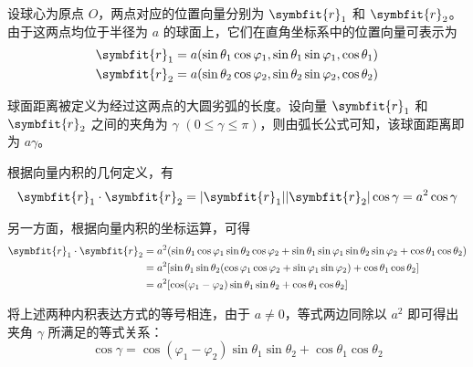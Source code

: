 \begin{myproof}
    设球心为原点 $O$，两点对应的位置向量分别为 $\symbfit{r}_1$ 和 $\symbfit{r}_2$。由于这两点均位于半径为 $a$ 的球面上，它们在直角坐标系中的位置向量可表示为
    \begin{equation}
        \begin{aligned}
            \symbfit{r}_1 & = a (\sin\theta_1 \cos\varphi_1, \sin\theta_1 \sin\varphi_1, \cos\theta_1) \\
            \symbfit{r}_2 & = a (\sin\theta_2 \cos\varphi_2, \sin\theta_2 \sin\varphi_2, \cos\theta_2)
        \end{aligned}
    \end{equation}

    球面距离被定义为经过这两点的大圆劣弧的长度。设向量 $\symbfit{r}_1$ 和 $\symbfit{r}_2$ 之间的夹角为 $\gamma$ $(0 \leqslant \gamma \leqslant \pi)$，则由弧长公式可知，该球面距离即为 $a\gamma$。

    根据向量内积的几何定义，有
    \begin{equation}
        \symbfit{r}_1 \cdot \symbfit{r}_2 = |\symbfit{r}_1| |\symbfit{r}_2| \cos\gamma = a^2 \cos\gamma
    \end{equation}

    另一方面，根据向量内积的坐标运算，可得
    \begin{equation}
        \begin{aligned}
            \symbfit{r}_1 \cdot \symbfit{r}_2 & = a^2 (\sin\theta_1 \cos\varphi_1 \sin\theta_2 \cos\varphi_2 + \sin\theta_1 \sin\varphi_1 \sin\theta_2 \sin\varphi_2 + \cos\theta_1 \cos\theta_2) \\
                                              & = a^2 [\sin\theta_1 \sin\theta_2 (\cos\varphi_1 \cos\varphi_2 + \sin\varphi_1 \sin\varphi_2) + \cos\theta_1 \cos\theta_2]                         \\
                                              & = a^2 [\cos(\varphi_1 - \varphi_2) \sin\theta_1 \sin\theta_2 + \cos\theta_1 \cos\theta_2]
        \end{aligned}
    \end{equation}

    将上述两种内积表达方式的等号相连，由于 $a \neq 0$，等式两边同除以 $a^2$ 即可得出夹角 $\gamma$ 所满足的等式关系：
    \begin{equation}
        \boxed{\cos\gamma = \cos(\varphi_1 - \varphi_2) \sin\theta_1 \sin\theta_2 + \cos\theta_1 \cos\theta_2}
    \end{equation}
\end{myproof}

\endinput
